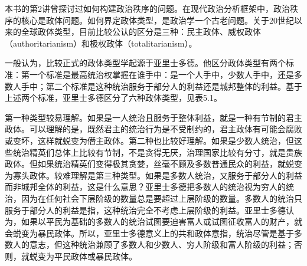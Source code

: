 





本书的第2讲曾探讨过如何构建政治秩序的问题。在现代政治分析框架中，政治秩序的核心是政体问题。如何界定政体类型，是政治学一个古老问题。关于20世纪以来的全球政体类型，目前比较公认的区分是三种：民主政体、威权政体（authoritarianism）和极权政体（totalitarianism）。

一般认为，比较正式的政体类型学起源于亚里士多德。他区分政体类型有两个标准：第一个标准是最高统治权掌握在谁手中：是一个人手中，少数人手中，还是多数人手中；第二个标准是这种统治服务于部分人的利益还是城邦整体的利益。基于上述两个标准，亚里士多德区分了六种政体类型，见表5.1。


第一种类型较易理解。如果是一人统治且服务于整体利益，就是一种有节制的君主政体。可以理解的是，既然君主的统治行为是不受制约的，君主政体有可能会腐败或变坏，这样就蜕变为僭主政体。第二种也比较好理解。如果是少数人统治，但这些统治精英们总体上比较有节制，不是贪得无厌，治理国家比较有分寸，就是贵族政体。但如果统治精英们变得极其贪婪，丝毫不顾及多数普通民众的利益，就蜕变为寡头政体。较难理解是第三种类型。如果是多数人统治，又服务于部分人的利益而非城邦全体的利益，这是什么意思？亚里士多德把多数人的统治视为穷人的统治，因为在任何社会下层阶级的数量总是要超过上层阶级的数量。多数人的统治只服务于部分人的利益是指，这种统治完全不考虑上层阶级的利益。亚里士多德认为，如果以平民为基础的多数人的统治试图要迫害富人或试图征收富人的财产，就会蜕变为暴民政体。所以，亚里士多德意义上的共和政体意指，统治尽管是基于多数人的意志，但这种统治兼顾了多数人和少数人、穷人阶级和富人阶级的利益；否则，就蜕变为平民政体或暴民政体。

